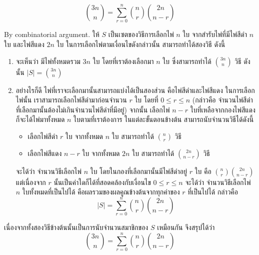 \begin{example}
\[\binom{3n}{n}=\sum_{r=0}^{n}{\binom{n}{r}\binom{2n}{n-r}}\]
\begin{pf}
By combinatorial argument. \enskip ให้ $S$ เป็นเซตของวิธีการเลือกไพ่ $n$ ใบ จากสำรับไพ่ที่มีไพ่สีดำ $n$ ใบ และไพ่สีแดง $2n$ ใบ \enskip ในการเลือกไพ่ตามเงื่อนไขดังกล่าวนั้น สามารถทำได้สองวิธี ดังนี้
\begin{enumerate}[]
\item จะเห็นว่า มีไพ่ทั้งหมดรวม $3n$ ใบ โดยที่เราต้องเลือกมา $n$ ใบ ซึ่งสามารถทำได้ $\binom{3n}{n}$ วิธี \enskip ดังนั้น $|S|=\binom{3n}{n}$
\item อย่างไรก็ดี ไพ่ที่เราจะเลือกมานั้นสามารถแบ่งได้เป็นสองส่วน คือไพ่สีดำและไพ่สีแดง \enskip ในการเลือกไพ่นั้น เราสามารถเลือกไพ่สีดำมาก่อนจำนวน $r$ ใบ โดยที่ $0\leq r\leq n$ (กล่าวคือ จำนวนไพ่สีดำที่เลือกมานั้นต้องไม่เกินจำนวนไพ่สีดำที่มีอยู่) \enskip จากนั้น เลือกไพ่ $n-r$ ใบที่เหลือจากกองไพ่สีแดง ก็จะได้ไพ่มาทั้งหมด $n$ ใบตามที่เราต้องการ \enskip ในแต่ละขั้นตอนข้างต้น สามารถนับจำนวนวิธีได้ดังนี้
\begin{itemize}[]
\item เลือกไพ่สีดำ $r$ ใบ จากทั้งหมด $n$ ใบ สามารถทำได้ $\binom{n}{r}$ วิธี
\item เลือกไพ่สีแดง $n-r$ ใบ จากทั้งหมด $2n$ ใบ สามารถทำได้ $\binom{2n}{n-r}$ วิธี
\end{itemize}
จะได้ว่า จำนวนวิธีเลือกไพ่ $n$ ใบ โดยในกองที่เลือกมานั้นมีไพ่สีดำอยู่ $r$ ใบ คือ $\binom{n}{r}\binom{2n}{n-r}$ \enskip แต่เนื่องจาก $r$ นั้นเป็นค่าใดก็ได้ที่สอดคล้องกับเงื่อนไข $0\leq r\leq n$ จะได้ว่า จำนวนวิธีเลือกไพ่ $n$ ใบทั้งหมดที่เป็นไปได้ คือผลรวมของผลคูณข้างต้นจากทุกค่าของ $r$ ที่เป็นไปได้ กล่าวคือ \[|S|=\sum_{r=0}^{n}{\binom{n}{r}\binom{2n}{n-r}}\]
\end{enumerate}
เนื่องจากทั้งสองวิธีข้างต้นนั้นเป็นการนับจำนวนสมาชิกของ $S$ เหมือนกัน จึงสรุปได้ว่า
\[\binom{3n}{n}=\sum_{r=0}^{n}{\binom{n}{r}\binom{2n}{n-r}}\]
\end{pf}
\end{example}
